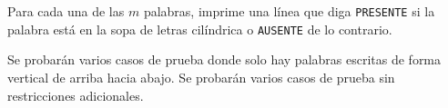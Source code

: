 \documentclass{oci}
\begin{document}
\begin{outputDescription}
  Para cada una de las $m$ palabras, imprime una línea que diga \texttt{PRESENTE} si la palabra está
  en la sopa de letras cilíndrica o \texttt{AUSENTE} de lo contrario.
\end{outputDescription}

\begin{scoreDescription}
   Se probarán varios casos de prueba donde solo hay palabras escritas de forma vertical de arriba
  hacia abajo.
   Se probarán varios casos de prueba sin restricciones adicionales.
\end{scoreDescription}

\begin{sampleDescription}
\end{sampleDescription}
\end{document}
